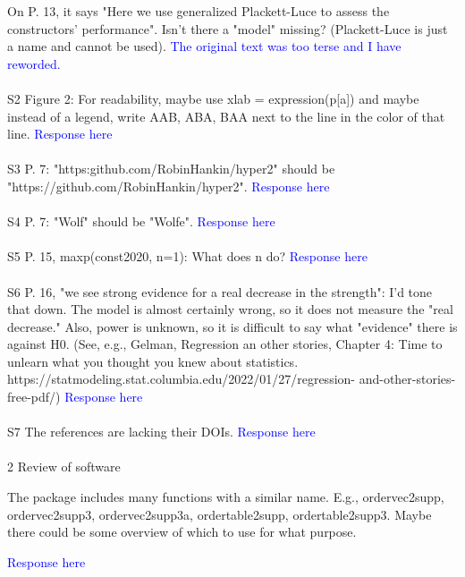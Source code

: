 \documentclass[12pt]{article}
\begin{document}
On P. 13, it says "Here we use generalized Plackett-Luce to assess the
constructors' performance". Isn't there a "model" missing?
(Plackett-Luce is just a name and cannot be used).
\textcolor{blue}{The original text was too terse and I have
  reworded.}\\ \\


S2 Figure 2: For readability, maybe use xlab = expression(p[a]) and maybe
instead of a legend, write AAB, ABA, BAA next to the line in the color
of that line.
\textcolor{blue}{Response here}\\ \\


S3 P. 7: "https:github.com/RobinHankin/hyper2" should be
"https://github.com/RobinHankin/hyper2".
\textcolor{blue}{Response here}\\ \\


S4 P. 7: "Wolf" should be "Wolfe".
\textcolor{blue}{Response here}\\ \\


S5 P. 15, maxp(const2020, n=1): What does n do?
\textcolor{blue}{Response here}\\ \\



S6 P. 16, "we see strong evidence for a real decrease in the strength": I'd tone
that down. The model is almost certainly wrong, so it does not measure
the "real decrease." Also, power is unknown, so it is difficult to say what
"evidence" there is against H0. (See, e.g., Gelman, Regression an other
stories, Chapter 4: Time to unlearn what you thought you knew about
statistics. https://statmodeling.stat.columbia.edu/2022/01/27/regression-
and-other-stories-free-pdf/)
\textcolor{blue}{Response here}\\ \\



S7 The references are lacking their DOIs.
\textcolor{blue}{Response here}\\ \\

2 Review of software

The package includes many functions with a similar name. E.g., ordervec2supp,
ordervec2supp3, ordervec2supp3a, ordertable2supp, ordertable2supp3. Maybe
there could be some overview of which to use for what purpose.

\textcolor{blue}{Response here}\\ \\
\end{document}
